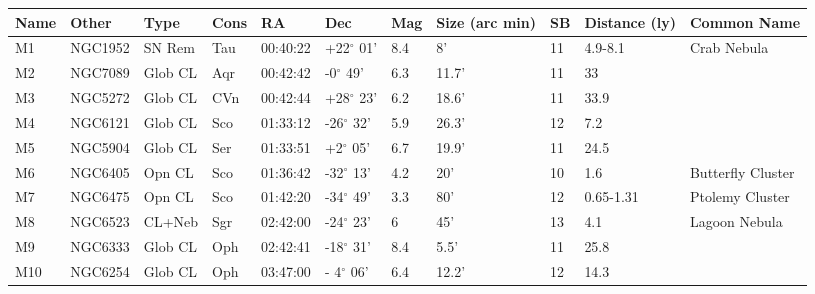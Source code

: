\documentclass[10pt,twoside,a4paper,english]{article}
\begin{document}
\begin{longtable}{@{}lllllllllll@{}} 
\hline 
{\bf Name} & {\bf Other} & {\bf Type} & {\bf Cons} & {\bf RA}  & {\bf Dec} & {\bf Mag} & {\bf Size (arc min)} & {\bf SB} & {\bf Distance (ly)} & {\bf Common Name}               \\ 
\hline 
M1         & NGC1952     & SN Rem     & Tau       & 00:40:22 & +22$^{\circ}$ 01'  & 8.4       & 8'                   & 11       & 4.9-8.1             & Crab Nebula                               \\ 
M2         & NGC7089     & Glob CL    & Aqr       & 00:42:42 & -0$^{\circ}$ 49'   & 6.3       & 11.7'                & 11       & 33                  &                                           \\ 
M3         & NGC5272     & Glob CL    & CVn       & 00:42:44 & +28$^{\circ}$ 23'  & 6.2       & 18.6'                & 11       & 33.9                &                                           \\ 
M4         & NGC6121     & Glob CL    & Sco       & 01:33:12 & -26$^{\circ}$ 32'  & 5.9       & 26.3'                & 12       & 7.2                 &                                           \\ 
M5         & NGC5904     & Glob CL    & Ser       & 01:33:51 & +2$^{\circ}$ 05'   & 6.7       & 19.9'                & 11       & 24.5                &                                           \\ 
M6         & NGC6405     & Opn CL     & Sco       & 01:36:42 & -32$^{\circ}$ 13'  & 4.2       & 20'                  & 10       & 1.6                 & Butterfly Cluster                         \\ 
M7         & NGC6475     & Opn CL     & Sco       & 01:42:20 & -34$^{\circ}$ 49'  & 3.3       & 80'                  & 12       & 0.65-1.31           & Ptolemy Cluster                           \\ 
M8         & NGC6523     & CL+Neb     & Sgr       & 02:42:00 & -24$^{\circ}$ 23'  & 6         & 45'                  & 13       & 4.1                 & Lagoon Nebula                             \\ 
M9         & NGC6333     & Glob CL    & Oph       & 02:42:41 & -18$^{\circ}$ 31'  & 8.4       & 5.5'                 & 11       & 25.8                &                                           \\ 
M10        & NGC6254     & Glob CL    & Oph       & 03:47:00 & - 4$^{\circ}$ 06'  & 6.4       & 12.2'                & 12       & 14.3                &                                           \\ 

\end{longtable}
\end{document}

